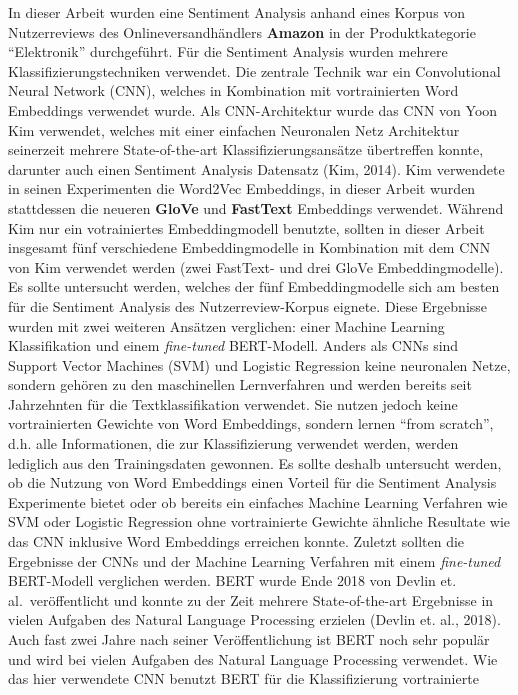\documentclass[11pt]{article}
\begin{document}
In dieser Arbeit wurden eine Sentiment Analysis anhand eines Korpus von
Nutzerreviews des Onlineversandhändlers \textbf{Amazon} in der
Produktkategorie ``Elektronik'' durchgeführt. Für die Sentiment Analysis
wurden mehrere Klassifizierungstechniken verwendet. Die zentrale Technik
war ein Convolutional Neural Network (CNN), welches in Kombination mit
vortrainierten Word Embeddings verwendet wurde. Als CNN-Architektur
wurde das CNN von Yoon Kim verwendet, welches mit einer einfachen
Neuronalen Netz Architektur seinerzeit mehrere State-of-the-art
Klassifizierungsansätze übertreffen konnte, darunter auch einen
Sentiment Analysis Datensatz (Kim, 2014). Kim verwendete in seinen
Experimenten die Word2Vec Embeddings, in dieser Arbeit wurden
stattdessen die neueren \textbf{GloVe} und \textbf{FastText} Embeddings
verwendet. Während Kim nur ein votrainiertes Embeddingmodell benutzte,
sollten in dieser Arbeit insgesamt fünf verschiedene Embeddingmodelle in
Kombination mit dem CNN von Kim verwendet werden (zwei FastText- und
drei GloVe Embeddingmodelle). Es sollte untersucht werden, welches der
fünf Embeddingmodelle sich am besten für die Sentiment Analysis des
Nutzerreview-Korpus eignete. Diese Ergebnisse wurden mit zwei weiteren
Ansätzen verglichen: einer Machine Learning Klassifikation und einem
\emph{fine-tuned} BERT-Modell. Anders als CNNs sind Support Vector
Machines (SVM) und Logistic Regression keine neuronalen Netze, sondern
gehören zu den maschinellen Lernverfahren und werden bereits seit
Jahrzehnten für die Textklassifikation verwendet. Sie nutzen jedoch
keine vortrainierten Gewichte von Word Embeddings, sondern lernen ``from
scratch'', d.h. alle Informationen, die zur Klassifizierung verwendet
werden, werden lediglich aus den Trainingsdaten gewonnen. Es sollte
deshalb untersucht werden, ob die Nutzung von Word Embeddings einen
Vorteil für die Sentiment Analysis Experimente bietet oder ob bereits
ein einfaches Machine Learning Verfahren wie SVM oder Logistic
Regression ohne vortrainierte Gewichte ähnliche Resultate wie das CNN
inklusive Word Embeddings erreichen konnte. Zuletzt sollten die
Ergebnisse der CNNs und der Machine Learning Verfahren mit einem
\emph{fine-tuned} BERT-Modell verglichen werden. BERT wurde Ende 2018
von Devlin et. al.~veröffentlicht und konnte zu der Zeit mehrere
State-of-the-art Ergebnisse in vielen Aufgaben des Natural Language
Processing erzielen (Devlin et. al., 2018). Auch fast zwei Jahre nach
seiner Veröffentlichung ist BERT noch sehr populär und wird bei vielen
Aufgaben des Natural Language Processing verwendet. Wie das hier
verwendete CNN benutzt BERT für die Klassifizierung vortrainierte
\end{document}
